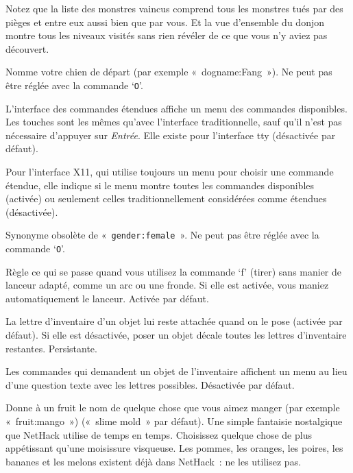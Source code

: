 \documentclass[titlepage]{article}
\begin{document}
\begin{description}
Notez que la liste des monstres vaincus comprend tous les monstres tués
par des pièges et entre eux aussi bien que par vous.
Et la vue d'ensemble du donjon montre tous les niveaux visités sans rien
révéler de ce que vous n'y aviez pas découvert.

\item[{dogname}]
Nomme votre chien de départ (par exemple «~dogname:Fang~»).
Ne peut pas être réglée avec la commande `\texttt{O}'.

\item[{extmenu}]
L'interface des commandes étendues affiche un menu des commandes
disponibles.
Les touches sont les mêmes qu'avec l'interface traditionnelle, sauf qu'il
n'est pas nécessaire d'appuyer sur \textit{Entrée}.
Elle existe pour l'interface tty (désactivée par défaut).


Pour l'interface X11, qui utilise toujours un menu pour choisir une
commande étendue, elle indique si le menu montre toutes les commandes
disponibles (activée) ou seulement celles traditionnellement considérées
comme étendues (désactivée).

\item[{female}]
Synonyme obsolète de «~\texttt{gender:female}~».
Ne peut pas être réglée avec la commande `\texttt{O}'.

\item[{fireassist}]
Règle ce qui se passe quand vous utilisez la commande `f' (tirer)
sans manier de lanceur adapté, comme un arc ou une fronde.
Si elle est activée, vous maniez automatiquement le lanceur.
Activée par défaut.

\item[{fixinv}]
La lettre d'inventaire d'un objet lui reste attachée quand on le pose
(activée par défaut).
Si elle est désactivée, poser un objet décale toutes les lettres
d'inventaire restantes.
Persistante.

\item[{force\_invmenu}]
Les commandes qui demandent un objet de l'inventaire affichent un menu au
lieu d'une question texte avec les lettres possibles.
Désactivée par défaut.

\item[{fruit}]
Donne à un fruit le nom de quelque chose que vous aimez manger (par
exemple «~fruit:mango~») («~slime mold~» par défaut).
Une simple fantaisie nostalgique que NetHack utilise de temps en temps.
Choisissez quelque chose de plus appétissant qu'une moisissure visqueuse.
Les pommes, les oranges, les poires, les bananes et les melons existent
déjà dans NetHack~: ne les utilisez pas.


\end{description}
\end{document}
